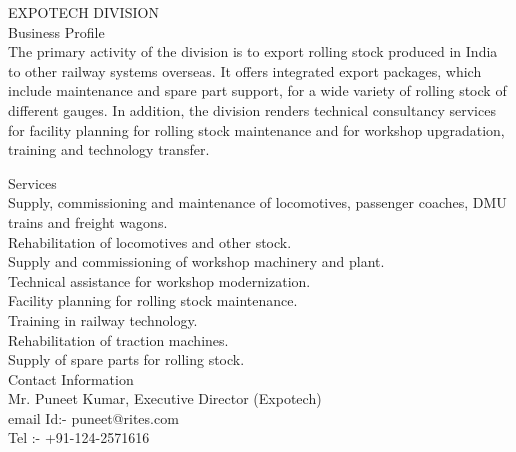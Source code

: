 EXPOTECH DIVISION\\

Business Profile\\

The primary activity of the division is to export rolling stock produced in India to other railway systems overseas.  It offers integrated export packages, which include maintenance and spare part support, for a wide variety of rolling stock of different gauges.  In addition, the division renders technical consultancy services for facility planning for rolling stock maintenance and for workshop upgradation, training and technology transfer.
\newline

Services\\

Supply, commissioning and maintenance of locomotives, passenger coaches, DMU trains and freight wagons.\\
Rehabilitation of locomotives and other stock.\\
Supply and commissioning of workshop machinery and plant.\\
Technical assistance for workshop modernization.\\
Facility planning for rolling stock maintenance.\\
Training in railway technology.\\
Rehabilitation of traction machines.\\
Supply of spare parts for rolling stock.\\
 
Contact Information\\

Mr. Puneet Kumar, Executive Director (Expotech)\\
email Id:- puneet@rites.com\\
Tel :- +91-124-2571616 \\

 